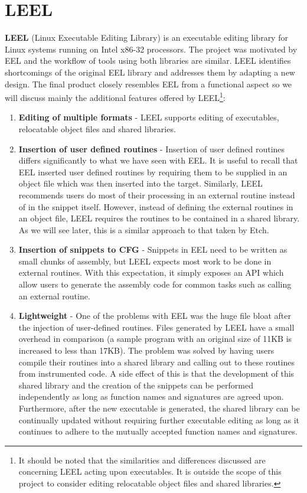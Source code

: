\section{LEEL}

\textbf{LEEL} (Linux Executable Editing Library) is an executable editing library for Linux systems running on Intel x86-32 processors\cite{leel}. The project was motivated by EEL and the workflow of tools using both libraries are similar. LEEL identifies shortcomings of the original EEL library and addresses them by adapting a new design. The final product closely resembles EEL from a functional aspect so we will discuss mainly the additional features offered by LEEL\footnote{It should be noted that the similarities and differences discussed are concerning LEEL acting upon executables. It is outside the scope of this project to consider editing relocatable object files and shared libraries.}:

\begin{enumerate}
 \item \textbf{Editing of multiple formats} - LEEL supports editing of executables, relocatable object files and shared libraries.
 \item \textbf{Insertion of user defined routines} - Insertion of user defined routines differs significantly to what we have seen with EEL. It is useful to recall that EEL inserted user defined routines by requiring them to be supplied in an object file which was then inserted into the target. Similarly, LEEL recommends users do most of their processing in an external routine instead of in the snippet itself. However, instead of defining the external routines in an object file, LEEL requires the routines to be contained in a shared library. As we will see later, this is a similar approach to that taken by Etch.
 \item \textbf{Insertion of snippets to CFG} - Snippets in EEL need to be written as small chunks of assembly, but LEEL expects most work to be done in external routines. With this expectation, it simply exposes an API which allow users to generate the assembly code for common tasks such as calling an external routine.
 \item \textbf{Lightweight} - One of the problems with EEL was the huge file bloat after the injection of user-defined routines. Files generated by LEEL have a small overhead in comparison (a sample program with an original size of 11KB is increased to less than 17KB). The problem was solved by having users compile their routines into a shared library and calling out to these routines from instrumented code. A side effect of this is that the development of this shared library and the creation of the snippets can be performed independently as long as function names and signatures are agreed upon. Furthermore, after the new executable is generated, the shared library can be continually updated without requiring further executable editing as long as it continues to adhere to the mutually accepted function names and signatures.
\end{enumerate}


